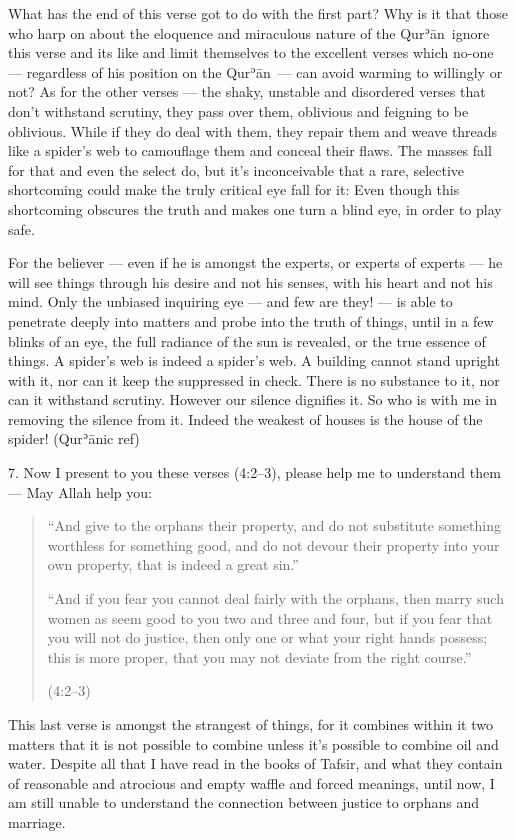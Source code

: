 \documentclass[12pt]{memoir}
\def\´{ʾ} %
\def \Quran{Qur\-\´ān} %
\newcommand{\QRef}[1]{{\color{darkblue}#1}}
\begin{document}
What has the end of this verse got to do with the first part?
Why is it that those who harp on about the eloquence
and miraculous nature of the \Quran\ ignore this verse
and its like and limit themselves to the excellent verses which no-one —
regardless of his position on the \Quran\ —
can avoid warming to willingly or not?
As for the other verses — the shaky, unstable and disordered verses
that don’t withstand scrutiny, they pass over them,
oblivious and feigning to be oblivious.
While if they do deal with them, they repair them
and weave threads like a spider’s web to camouflage them
and conceal their flaws.
The masses fall for that and even the select do,
but it’s inconceivable that a rare,
selective shortcoming could make the truly critical eye fall for it:
Even though this shortcoming obscures the truth
and makes one turn a blind eye, in order to play safe.

For the believer — even if he is amongst the experts, or experts of experts —
he will see things through his desire and not his senses,
with his heart and not his mind.
Only the unbiased inquiring eye — and few are they! —
is able to penetrate deeply into matters and probe into the truth of things,
until in a few blinks of an eye, the full radiance of the sun is revealed,
or the true essence of things.
A spider’s web is indeed a spider’s web.
A building cannot stand upright with it,
nor can it keep the suppressed in check.
There is no substance to it, nor can it withstand scrutiny.
However our silence dignifies it.
So who is with me in removing the silence from it.
Indeed the weakest of houses is the house of the spider! (\Quran{}ic ref)

7. Now I present to you these verses (\QRef{4:2–3}),
please help me to understand them — May Allah help you:

\begin{quote}
“And give to the orphans their property, and do not substitute
something worthless for something good,
and do not devour their property into your own property,
that is indeed a great sin.”

“And if you fear you cannot deal fairly with the orphans,
then marry such women as seem good to you two and three and four,
but if you fear that you will not do justice,
then only one or what your right hands possess; this is more proper,
that you may not deviate from the right course.”

(\QRef{4:2–3})
\end{quote}

This last verse is amongst the strangest of things,
for it combines within it two matters that it is not possible
to combine unless it’s possible to combine oil and water.
Despite all that I have read in the books of Tafsir,
and what they contain of reasonable and atrocious and empty waffle
and forced meanings, until now, I am still unable to understand
the connection between justice to orphans and marriage.
\end{document}
